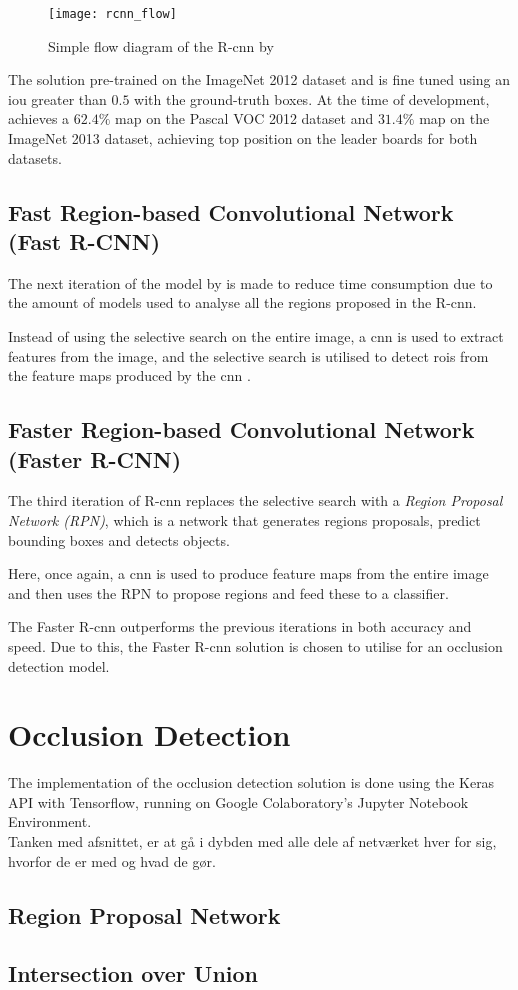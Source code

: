 \begin{figure}[H]
	\centering
	\texttt{[image: rcnn\_flow]}
	\caption{Simple flow diagram of the R-\gls{cnn} by \cite{Girshick2014}}
	\label{fig:rcnn_flow}
\end{figure}

The solution pre-trained on the ImageNet 2012 dataset and is fine tuned using an \gls{iou} greater than $0.5$ with the ground-truth boxes. At the time of development, \cite{Girshick2014} achieves a $62.4\%$ \gls{map} on the Pascal VOC 2012 dataset and $31.4\%$ \gls{map} on the ImageNet 2013 dataset, achieving top position on the leader boards for both datasets.

\subsection{Fast Region-based Convolutional Network (Fast R-CNN)}
The next iteration of the model by \cite{Girshick2015} is made to reduce time consumption due to the amount of models used to analyse all the regions proposed in the R-\gls{cnn}.

Instead of using the selective search on the entire image, a \gls{cnn} is used to extract features from the image, and the selective search is utilised to detect \gls{roi}s from the feature maps produced by the \gls{cnn} \citep{Girshick2015}.

\subsection{Faster Region-based Convolutional Network (Faster R-CNN)}
The third iteration of R-\gls{cnn} replaces the selective search with a \textit{Region Proposal Network (RPN)}, which is a network that generates regions proposals, predict bounding boxes and detects objects.

Here, once again, a \gls{cnn} is used to produce feature maps from the entire image and then uses the RPN to propose regions and feed these to a classifier.

The Faster R-\gls{cnn} outperforms the previous iterations in both accuracy and speed. Due to this, the Faster R-\gls{cnn} solution is chosen to utilise for an occlusion detection model.

\section{Occlusion Detection}
The implementation of the occlusion detection solution is done using the Keras API with Tensorflow, running on Google Colaboratory's Jupyter Notebook Environment.\\

Tanken med afsnittet, er at gå i dybden med alle dele af netværket hver for sig, hvorfor de er med og hvad de gør.

\subsection{Region Proposal Network}

\subsection{Intersection over Union}
